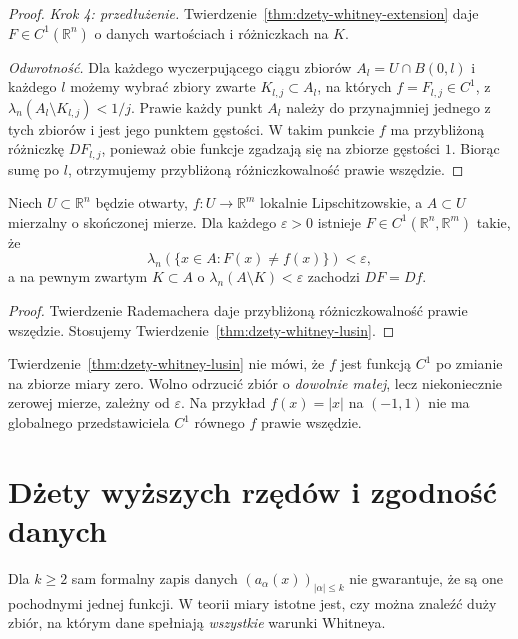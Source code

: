 \begin{proof}
\emph{Krok 4: przedłużenie.}
Twierdzenie~\ref{thm:dzety-whitney-extension}
daje $F\in C^1(\mathbb R^n)$ o danych wartościach
i różniczkach na $K$.

\emph{Odwrotność.}
Dla każdego wyczerpującego ciągu zbiorów
$A_l=U\cap B(0,l)$ i każdego $l$ możemy wybrać
zbiory zwarte $K_{l,j}\subset A_l$, na których
$f=F_{l,j}\in C^1$, z
$\lambda_n(A_l\setminus K_{l,j})<1/j$.
Prawie każdy punkt $A_l$ należy do przynajmniej
jednego z tych zbiorów i jest jego punktem gęstości.
W takim punkcie $f$ ma przybliżoną różniczkę
$DF_{l,j}$, ponieważ obie funkcje zgadzają się na
zbiorze gęstości $1$. Biorąc sumę po $l$,
otrzymujemy przybliżoną różniczkowalność prawie wszędzie.
\end{proof}

\begin{wniosek}
\label{cor:dzety-lusin-lipschitz}
Niech $U\subset\mathbb R^n$ będzie otwarty,
$f:U\to\mathbb R^m$ lokalnie Lipschitzowskie,
a $A\subset U$ mierzalny o skończonej mierze.
Dla każdego $\varepsilon>0$ istnieje
$F\in C^1(\mathbb R^n,\mathbb R^m)$ takie, że
\[
 \lambda_n(\{x\in A:F(x)\ne f(x)\})<\varepsilon,
\]
a na pewnym zwartym $K\subset A$ o
$\lambda_n(A\setminus K)<\varepsilon$ zachodzi
$DF=Df$.
\end{wniosek}
\begin{proof}
Twierdzenie Rademachera daje przybliżoną
różniczkowalność prawie wszędzie.
Stosujemy Twierdzenie~\ref{thm:dzety-whitney-lusin}.
\end{proof}

\begin{uwaga}
Twierdzenie~\ref{thm:dzety-whitney-lusin} nie mówi,
że $f$ jest funkcją $C^1$ po zmianie na zbiorze miary zero.
Wolno odrzucić zbiór o \emph{dowolnie małej}, lecz niekoniecznie
zerowej mierze, zależny od $\varepsilon$.
Na przykład $f(x)=|x|$ na $(-1,1)$ nie ma globalnego
przedstawiciela $C^1$ równego $f$ prawie wszędzie.
\end{uwaga}

\section{Dżety wyższych rzędów i zgodność danych}
Dla $k\ge2$ sam formalny zapis danych
$(a_\alpha(x))_{|\alpha|\le k}$ nie gwarantuje,
że są one pochodnymi jednej funkcji. W teorii miary
istotne jest, czy można znaleźć duży zbiór, na którym
dane spełniają \emph{wszystkie} warunki Whitneya.

